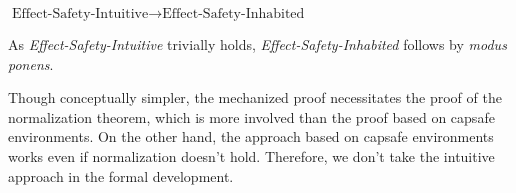 \begin{center}
  $ \text{Effect-Safety-Intuitive} \to \text{Effect-Safety-Inhabited}$
\end{center}

As \emph{Effect-Safety-Intuitive} trivially holds,
\emph{Effect-Safety-Inhabited} follows by \emph{modus ponens}.

Though conceptually simpler, the mechanized proof necessitates the
proof of the normalization theorem, which is more involved than the
proof based on capsafe environments. On the other hand, the approach
based on capsafe environments works even if normalization doesn't
hold. Therefore, we don't take the intuitive approach in the formal
development.

